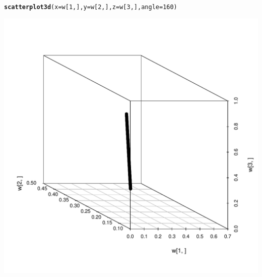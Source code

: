 \documentclass{article}\usepackage{graphicx, color}
\makeatletter
\def\maxwidth{ %
  \ifdim\Gin@nat@width>\linewidth
    \linewidth
  \else
    \Gin@nat@width
  \fi
}
\newcommand{\hlfunctioncall}[1]{\textcolor[rgb]{0.501960784313725,0,0.329411764705882}{\textbf{#1}}}%
\newenvironment{kframe}{%
 \def\at@end@of@kframe{}%
 \ifinner\ifhmode%
  \def\at@end@of@kframe{\end{minipage}}%
  \begin{minipage}{\columnwidth}%
 \fi\fi%
 \def\FrameCommand##1{\hskip\@totalleftmargin \hskip-\fboxsep
 \colorbox{shadecolor}{##1}\hskip-\fboxsep
     \hskip-\linewidth \hskip-\@totalleftmargin \hskip\columnwidth}%
 \MakeFramed {\advance\hsize-\width
   \@totalleftmargin\z@ \linewidth\hsize
   \@setminipage}}%
 {\par\unskip\endMakeFramed%
 \at@end@of@kframe}
\newenvironment{knitrout}{}{} %
\makeatother
\begin{document}
\begin{knitrout}
\begin{kframe}
\begin{alltt}
\hlfunctioncall{scatterplot3d}(x = w[1, ], y = w[2, ], z = w[3, ], angle = 160)
\end{alltt}
\end{kframe}
\includegraphics[width=\maxwidth]{figure/demo} 

\end{knitrout}
\end{document}

